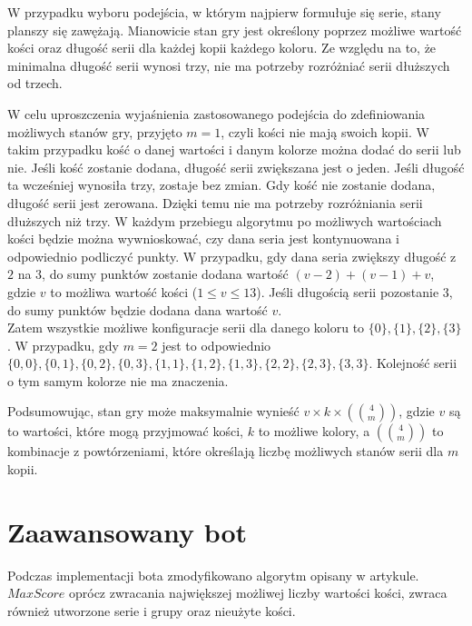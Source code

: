  W przypadku wyboru podejścia, w którym najpierw formułuje się serie, stany planszy się zawężają. Mianowicie stan gry jest określony poprzez możliwe wartość kości oraz długość serii dla każdej kopii każdego koloru. Ze względu na to, że minimalna długość serii wynosi trzy, nie ma potrzeby rozróżniać serii dłuższych od trzech. 
 
 W celu uproszczenia wyjaśnienia zastosowanego podejścia do zdefiniowania możliwych stanów gry, przyjęto $m = 1$, czyli kości nie mają swoich kopii. W takim przypadku kość o danej wartości i danym kolorze można dodać do serii lub nie. Jeśli kość zostanie dodana, długość serii zwiększana jest o jeden. Jeśli długość ta wcześniej wynosiła trzy, zostaje bez zmian. Gdy kość nie zostanie dodana, długość serii jest zerowana. Dzięki temu nie ma potrzeby rozróżniania serii dłuższych niż trzy. W każdym przebiegu algorytmu po możliwych wartościach kości będzie można wywnioskować, czy dana seria jest kontynuowana i odpowiednio podliczyć punkty. W przypadku, gdy dana seria zwiększy długość z $2$ na $3$, do sumy punktów zostanie dodana wartość $(v-2)+(v-1)+v$, gdzie $v$ to możliwa wartość kości ($1 \le v \le 13$). Jeśli długością serii pozostanie $3$, do sumy punktów będzie dodana dana wartość $v$. \\
 Zatem wszystkie możliwe konfiguracje serii dla danego koloru to $\{0\}, \{1\}, \{2\}, \{3\}$. W przypadku, gdy $m=2$ jest to odpowiednio $\{0,0\}, \{0,1\}, \{0,2\}, \{0,3\}, \{1,1\}, \{1,2\}, \{1,3\}, \{2,2\},\{2,3\}, \{3,3\}$. Kolejność serii o tym samym kolorze nie ma znaczenia.
 
 Podsumowując, stan gry może maksymalnie wynieść $v \times k \times \left(\!\!{4\choose m}\!\!\right)$, gdzie $v$ są to wartości, które mogą przyjmować kości, $k$ to możliwe kolory, a $\left(\!\!{4\choose m}\!\!\right)$ to kombinacje z powtórzeniami, które określają liczbę możliwych stanów serii dla $m$ kopii.

\section{Zaawansowany bot}

Podczas implementacji bota zmodyfikowano algorytm opisany w artykule. $MaxScore$ oprócz zwracania największej możliwej liczby wartości kości, zwraca również utworzone serie i grupy oraz nieużyte kości. \\

